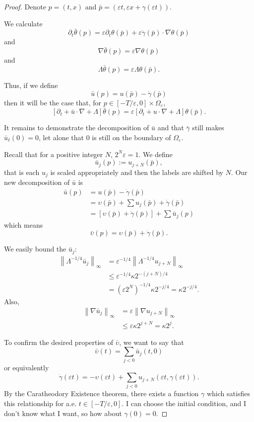 \documentclass[11pt]{amsart}
\theoremstyle{remark}
\newcommand{\eps}{\varepsilon}
\newcommand{\norm}[1]{\left\lVert#1\right\rVert}
\newcommand{\bracket}[1]{\left[ #1 \right]}
\newcommand{\del}{\partial}
\newcommand{\grad}{\nabla}
\begin{document}
\begin{proof}
Denote $p = (t,x)$ and $\bar{p} = (\eps t, \eps x + \gamma(\eps t))$.  

We calculate
\[ \del_t \bar{\theta}(p) = \eps \del_t \theta(\bar{p}) + \eps \dot{\gamma}(\bar{p}) \cdot \grad \theta (\bar{p}) \]
and 
\[ \grad \bar{\theta}(p) = \eps \grad \theta(\bar{p}) \]
and
\[ \Lambda \bar{\theta}(p) = \eps \Lambda \theta(\bar{p}). \]

Thus, if we define
\[ \bar{u}(p) = u(\bar{p}) - \dot{\gamma}(\bar{p}) \]
then it will be the case that, for $p \in [-T/\eps,0]\times \Omega_\eps$, 
\[ \bracket{\del_t + \bar{u}\cdot\grad + \Lambda} \bar{\theta}(p) = \eps \bracket{\del_t + u\cdot\grad + \Lambda} \theta(\bar{p}). \]

It remains to demonstrate the decomposition of $\bar{u}$ and that $\bar{\gamma}$ still makes $\bar{u}_\ell(0)=0$, let alone that $0$ is still on the boundary of $\Omega_\eps$.  

Recall that for a positive integer $N$, $2^N \eps = 1$.  We define 
\[ \bar{u}_j(p) := u_{j+N}(\bar{p}), \]
that is each $u_j$ is scaled appropriately and then the labels are shifted by $N$.  Our new decomposition of $\bar{u}$ is
\begin{align*} 
\bar{u}(p) &= u(\bar{p}) - \dot{\gamma}(\bar{p})
\\ &= \upsilon(\bar{p}) + \sum u_j(\bar{p}) + \dot{\gamma}(\bar{p})
\\ &= \bracket{\upsilon(\bar{p}) + \dot{\gamma}(\bar{p})} + \sum \bar{u}_j (p)
\end{align*}
which means
\[ \bar{\upsilon}(p) = \upsilon(\bar{p}) + \dot{\gamma}(\bar{p}). \]

We easily bound the $\bar{u}_j$:
\begin{align*}
\norm{\Lambda^{-1/4} \bar{u}_j}_\infty &= \eps^{-1/4}\norm{\Lambda^{-1/4} u_{j+N}}_\infty 
\\ &\leq \eps^{-1/4} \kappa 2^{-(j+N)/4}
\\ &= (\eps 2^N)^{-1/4} \kappa 2^{-j/4} = \kappa 2^{-j/4}.
\end{align*}
Also,
\begin{align*}
\norm{\grad \bar{u}_j}_\infty &= \eps \norm{\grad u_{j+N}}_\infty
\\ &\leq \eps \kappa 2^{j+N} = \kappa 2^j.
\end{align*}

To confirm the desired properties of $\bar{\upsilon}$, we want to say that
\[ \bar{\upsilon}(t) = \sum_{j<0} \bar{u}_j(t,0) \]
or equivalently
\[ \dot{\gamma}(\eps t) = -\upsilon(\eps t) +  \sum_{j<0} u_{j+N}(\eps t, \gamma(\eps t)). \]
By the Caratheodory Existence theorem, there exists a function $\gamma$ which satisfies this relationship for a.e. $t \in [-T/\eps, 0]$.  I can choose the initial condition, and I don't know what I want, so how about $\gamma(0)=0$.  


\end{proof}
\end{document}
